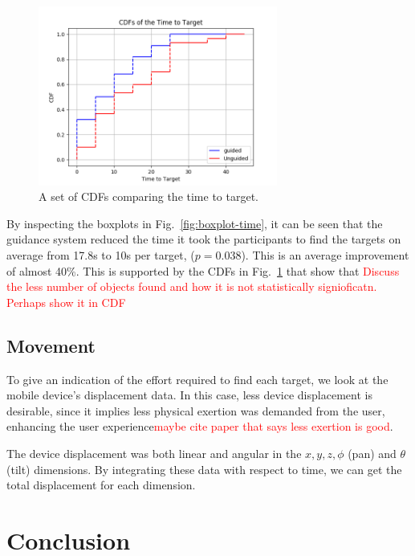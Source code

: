 \documentclass[runningheads]{llncs}
\newcommand\todo[1]{\textcolor{red}{#1}}
\begin{document}
\begin{figure}
  \centering
  \includegraphics[width=0.7\textwidth]{figures/cumplot_time_to_target.png}
  \caption{A set of CDFs comparing the time to target. }\label{fig:cum-time}
\end{figure}

By inspecting the boxplots in Fig.~\ref{fig:boxplot-time}, it can be seen that the guidance system reduced the time it took the participants to find the targets on average from 17.8s to 10s per target, ($p = 0.038$).
This is an average improvement of almost 40\%.
This is supported by the CDFs in Fig.~\ref{fig:cum-time} that show that \todo{Discuss the less number of objects found and how it is not statistically signioficatn. Perhaps show it in CDF}

\subsection{Movement}

To give an indication of the effort required to find each target, we look at the mobile device's displacement data. 
In this case, less device displacement is desirable, since it implies less physical exertion was demanded from the user, enhancing the user experience\todo{maybe cite paper that says less exertion is good}.

The device displacement was both linear and angular in the $x, y, z, \phi$ (pan) and $\theta$ (tilt) dimensions.
By integrating these data with respect to time, we can get the total displacement for each dimension.

\section{Conclusion}\label{sec:conclusion}



\end{document}
